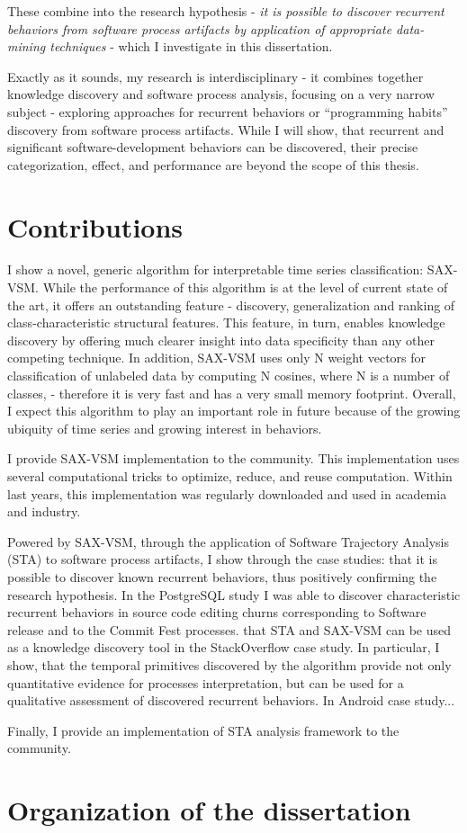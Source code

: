 These combine into the research hypothesis - \textit{it is possible to discover recurrent behaviors 
from software process artifacts by application of appropriate data-mining techniques} - 
which I investigate in this dissertation. 

Exactly as it sounds, my research is interdisciplinary - it combines together knowledge discovery and software process 
analysis, focusing on a very narrow subject - exploring approaches for recurrent behaviors or ``programming habits'' 
discovery from software process artifacts.
While I will show, that recurrent and significant software-development behaviors can be discovered,
their precise categorization, effect, and performance are beyond the scope of this thesis.

\section{Contributions}
I show a novel, generic algorithm for interpretable time series classification: SAX-VSM. 
While the performance of this algorithm is at the level of current state of the art, it offers an outstanding feature -
discovery, generalization and ranking of class-characteristic structural features. This feature, in turn, enables
knowledge discovery by offering much clearer insight into data specificity than any other competing technique.
In addition, SAX-VSM uses only N weight vectors for classification of unlabeled data by computing N cosines, where N is
a number of classes, - therefore it is very fast and has a very small memory footprint.
Overall, I expect this algorithm to play an important role in future because of the growing ubiquity of time series and
growing interest in behaviors.

I provide SAX-VSM implementation to the community. This implementation uses several computational tricks to optimize,
reduce, and reuse computation. Within last years, this implementation was regularly downloaded and used in academia and
industry. 

Powered by SAX-VSM, through the application of Software Trajectory Analysis (STA) to software process artifacts, I show
through the case studies: that it is possible to discover known recurrent behaviors, thus positively confirming the
research hypothesis. In the PostgreSQL study I was able to discover characteristic recurrent behaviors in source code
editing churns corresponding
to Software release and to the Commit Fest processes.
that STA and SAX-VSM can be used as a knowledge discovery tool in the StackOverflow case study. In particular, I show,
that the temporal primitives discovered by the algorithm provide not only quantitative evidence for processes
interpretation, but can be used for a qualitative assessment of discovered recurrent behaviors.
In Android case study...

Finally, I provide an implementation of STA analysis framework to the community. 

\section{Organization of the dissertation}